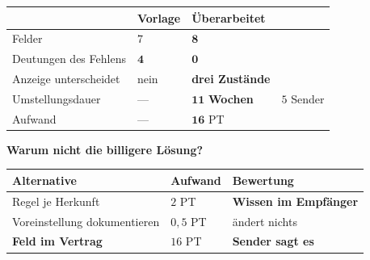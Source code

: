 \begin{merksatz}
\begin{center}
{\small
\renewcommand{\arraystretch}{1.45}
\begin{tabular}{@{}P{2.8cm}P{2.0cm}P{2.2cm}P{2.0cm}@{}}
\toprule
& \textbf{Vorlage} & \textbf{Überarbeitet} & \\
\midrule
Felder & $7$ & $\mathbf{8}$ & \\
Deutungen des Fehlens & $\mathbf{4}$ & $\mathbf{0}$ & \\
Anzeige unterscheidet & \textcolor{akzent}{nein} & \textcolor{gruen}{\textbf{drei Zustände}} & \\
Umstellungs\-dauer & --- & \textcolor{akzent}{$\mathbf{11}$ \textbf{Wochen}} & \textcolor{akzent}{$5$ Sender}\\
Aufwand & --- & $\mathbf{16}$ PT & \\
\bottomrule
\end{tabular}}
\end{center}

\begin{center}
\begin{minipage}{0.88\textwidth}
\end{minipage}
\end{center}

\textbf{Warum nicht die billigere Lösung?}

\begin{center}
\renewcommand{\arraystretch}{1.45}
\begin{tabular}{@{}P{3.0cm}P{2.0cm}P{2.6cm}@{}}
\toprule
\textbf{Alternative} & \textbf{Aufwand} & \textbf{Bewertung}\\
\midrule
Regel je Herkunft & \textcolor{gruen}{$2$ PT} & \textcolor{akzent}{\textbf{Wissen im Empfänger}}\\
Voreinstellung dokumentieren & \textcolor{gruen}{$0{,}5$ PT} & \textcolor{akzent}{ändert nichts}\\
\textbf{Feld im Vertrag} & $16$ PT & \textcolor{gruen}{\textbf{Sender sagt es}}\\
\bottomrule
\end{tabular}
\end{center}

\begin{center}
\end{center}
\end{merksatz}

